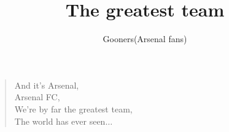 \documentclass[a4paper,12pt]{article}
\title{The greatest team}
\author{Gooners(Arsenal fans)}
\date{}
\begin{document}
	
	\maketitle
	
	\begin{verse}
		
		And it's Arsenal, \\
		Arsenal FC, \\
		We're by far the greatest team, \\
		The world has ever seen$\ldots$
		
	\end{verse}
	
\end{document}
